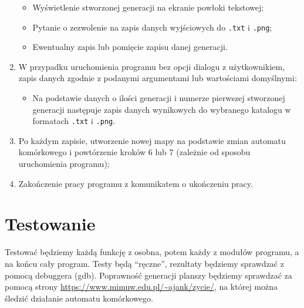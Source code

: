 \documentclass[a4paper,12pt]{article}
\begin{document}
\begin{enumerate}
\begin{itemize}
    \item Wyświetlenie stworzonej generacji na ekranie powłoki tekstowej;
	\item Pytanie o zezwolenie na zapis danych wyjściowych do \texttt{.txt} i \texttt{.png};
    \item Ewentualny zapis lub pomięcie zapisu danej generacji.
    \end{itemize}
\item W przypadku uruchomienia programu bez opcji dialogu z użytkownikiem, zapis danych zgodnie z podanymi argumentami lub wartościami domyślnymi:
	\begin{itemize}
    \item Na podstawie danych o ilości generacji i numerze pierwszej stworzonej generacji następuje zapis danych wynikowych do wybranego katalogu w formatach \texttt{.txt} i \texttt{.png}.
    \end{itemize}
\item Po każdym zapisie, utworzenie nowej mapy na podstawie zmian automatu komórkowego i powtórzenie kroków 6 lub 7 (zależnie od sposobu uruchomienia programu);
\item Zakończenie pracy programu z komunikatem o ukończeniu pracy.
\end{enumerate}

\section{Testowanie}
Testować będziemy każdą funkcję z osobna, potem każdy z modułów programu, a na końcu cały program. Testy będą “ręczne”, rezultaty będziemy sprawdzać z pomocą debuggera (gdb). Poprawność generacji planszy będziemy sprawdzać za pomocą strony \url{https://www.mimuw.edu.pl/~ajank/zycie/}, na której można śledzić działanie automatu komórkowego.
\end{document}
